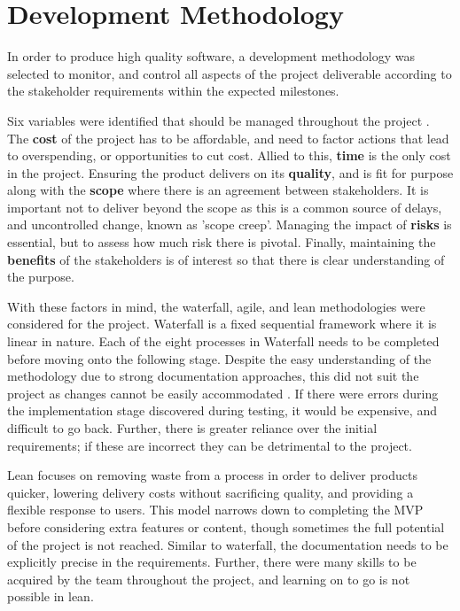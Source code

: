 \section{Development Methodology}
In order to produce high quality software, a development methodology was selected to monitor, and control all aspects of the project deliverable according to the stakeholder requirements within the expected milestones. 

Six variables were identified that should be managed throughout the project \cite{prince2}. The \textbf{cost} of the project has to be affordable, and need to factor actions that lead to overspending, or opportunities to cut cost. Allied to this, \textbf{time} is the only cost in the project. Ensuring the product delivers on its \textbf{quality}, and is fit for purpose along with the \textbf{scope} where there is an agreement between stakeholders. It is important not to deliver beyond the scope as this is a common source of delays, and uncontrolled change, known as 'scope creep'. Managing the impact of \textbf{risks} is essential, but to assess how much risk there is pivotal. Finally, maintaining the \textbf{benefits} of the stakeholders is of interest so that there is clear understanding of the purpose.

With these factors in mind, the waterfall, agile, and lean methodologies were considered for the project. Waterfall is a fixed sequential framework where it is linear in nature. Each of the eight processes in Waterfall needs to be completed before moving onto the following stage. Despite the easy understanding of the methodology due to strong documentation approaches, this did not suit the project as changes cannot be easily accommodated \cite{smartsheet}. If there were errors during the implementation stage discovered during testing, it would be expensive, and difficult to go back. Further, there is greater reliance over the initial requirements; if these are incorrect they can be detrimental to the project. 

Lean focuses on removing waste from a process in order to deliver products quicker, lowering delivery costs without sacrificing quality, and providing a flexible response to users. This model narrows down to completing the MVP before considering extra features or content, though sometimes the full potential of the project is not reached. Similar to waterfall, the documentation needs to be explicitly precise in the requirements. Further, there were many skills to be acquired by the team throughout the project, and learning on to go is not possible in lean.

